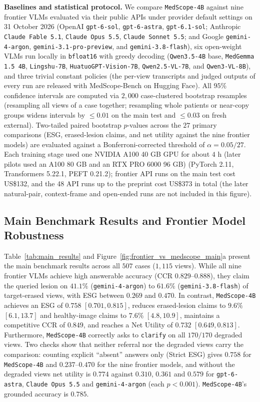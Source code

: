 \documentclass[5p,times,twocolumn,authoryear]{elsarticle}
\begin{document}
\textbf{Baselines and statistical protocol.} We compare \texttt{MedScope-4B} against nine frontier VLMs evaluated via their public APIs under provider default settings on 31 October 2026 (OpenAI \texttt{gpt-6-sol}, \texttt{gpt-6-astra}, \texttt{gpt-6.1-sol}; Anthropic \texttt{Claude Fable 5.1}, \texttt{Claude Opus 5.5}, \texttt{Claude Sonnet 5.5}; and Google \texttt{gemini-4-argon}, \texttt{gemini-3.1-pro-preview}, and \texttt{gemini-3.8-flash}), six open-weight VLMs run locally in \texttt{bfloat16} with greedy decoding (\texttt{Qwen3.5-4B} base, \texttt{MedGemma 1.5 4B}, \texttt{Lingshu-7B}, \texttt{HuatuoGPT-Vision-7B}, \texttt{Qwen2.5-VL-7B}, and \texttt{Qwen3-VL-8B}), and three trivial constant policies (the per-view transcripts and judged outputs of every run are released with MedScope-Bench on Hugging Face). All $95\%$ confidence intervals are computed via $2,000$ case-clustered bootstrap resamples (resampling all views of a case together; resampling whole patients or near-copy groups widens intervals by $\le 0.01$ on the main test and $\le 0.03$ on fresh external). Two-tailed paired bootstrap $p$-values across the $27$ primary comparisons (ESG, erased-lesion claims, and net utility against the nine frontier models) are evaluated against a Bonferroni-corrected threshold of $\alpha = 0.05/27$. Each training stage used one NVIDIA A100 40 GB GPU for about $4\text{ h}$ (later pilots used an A100 80 GB and an RTX PRO 6000 96 GB) (PyTorch 2.11, Transformers 5.22.1, PEFT 0.21.2); frontier API runs on the main test cost US\$132, and the 48 API runs up to the preprint cost US\$373 in total (the later natural-pair, context-frame and open-ended runs are not included in this figure).

\subsection{Main Benchmark Results and Frontier Model Robustness}
\label{subsec:exp_main}
Table~\ref{tab:main_results} and Figure~\ref{fig:frontier_vs_medscope_main}a present the main benchmark results across all $507$ cases ($1,115$ views). While all nine frontier VLMs achieve high answerable accuracy ($\text{CCR } 0.829\text{--}0.888$), they claim the queried lesion on $41.1\%$ (\texttt{gemini-4-argon}) to $61.6\%$ (\texttt{gemini-3.8-flash}) of target-erased views, with ESG between $0.269$ and $0.470$. In contrast, \texttt{MedScope-4B} achieves an ESG of $0.758$ $[0.701, 0.815]$, reduces erased-lesion claims to $9.6\%$ $[6.1, 13.7]$ and healthy-image claims to $7.6\%$ $[4.8, 10.9]$, maintains a competitive CCR of $0.849$, and reaches a Net Utility of $0.732$ $[0.649, 0.813]$. Furthermore, \texttt{MedScope-4B} correctly asks to \texttt{clarify} on all $170/170$ degraded views. Two checks show that neither referral nor the degraded views carry the comparison: counting explicit ``absent'' answers only (Strict ESG) gives $0.758$ for \texttt{MedScope-4B} and $0.237$--$0.470$ for the nine frontier models, and without the degraded views net utility is $0.774$ against $0.310$, $0.361$ and $0.579$ for \texttt{gpt-6-astra}, \texttt{Claude Opus 5.5} and \texttt{gemini-4-argon} (each $p < 0.001$). \texttt{MedScope-4B}'s grounded accuracy is $0.785$.
\end{document}
